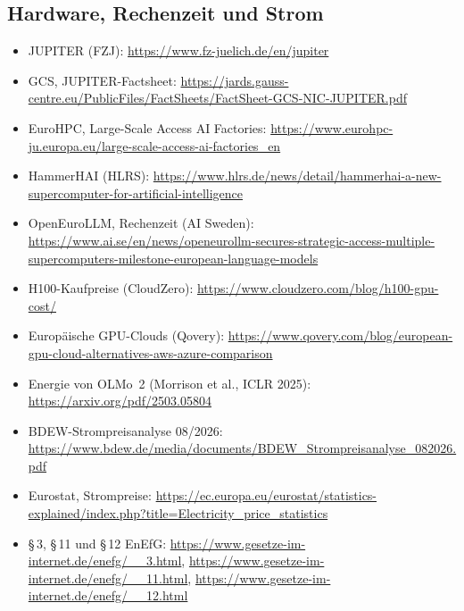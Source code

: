 \documentclass[a4paper,11pt]{article}
\begin{document}
{\subsection*{Hardware, Rechenzeit und Strom}
\begin{itemize}[itemsep=0.1em]
  \item JUPITER (FZJ): \url{https://www.fz-juelich.de/en/jupiter}
  \item GCS, JUPITER-Factsheet:
    \url{https://jards.gauss-centre.eu/PublicFiles/FactSheets/FactSheet-GCS-NIC-JUPITER.pdf}
  \item EuroHPC, Large-Scale Access AI Factories:
    \url{https://www.eurohpc-ju.europa.eu/large-scale-access-ai-factories_en}
  \item HammerHAI (HLRS):
    \url{https://www.hlrs.de/news/detail/hammerhai-a-new-supercomputer-for-artificial-intelligence}
  \item OpenEuroLLM, Rechenzeit (AI Sweden):
    \url{https://www.ai.se/en/news/openeurollm-secures-strategic-access-multiple-supercomputers-milestone-european-language-models}
  \item H100-Kaufpreise (CloudZero):
    \url{https://www.cloudzero.com/blog/h100-gpu-cost/}
  \item Europäische GPU-Clouds (Qovery):
    \url{https://www.qovery.com/blog/european-gpu-cloud-alternatives-aws-azure-comparison}
  \item Energie von OLMo~2 (Morrison et al., ICLR 2025):
    \url{https://arxiv.org/pdf/2503.05804}
  \item BDEW-Strompreisanalyse 08/2026:
    \url{https://www.bdew.de/media/documents/BDEW_Strompreisanalyse_082026.pdf}
  \item Eurostat, Strompreise:
    \url{https://ec.europa.eu/eurostat/statistics-explained/index.php?title=Electricity_price_statistics}
  \item \S\,3, \S\,11 und \S\,12 EnEfG:
    \url{https://www.gesetze-im-internet.de/enefg/__3.html},
    \url{https://www.gesetze-im-internet.de/enefg/__11.html},
    \url{https://www.gesetze-im-internet.de/enefg/__12.html}
\end{itemize}

}
\end{document}
